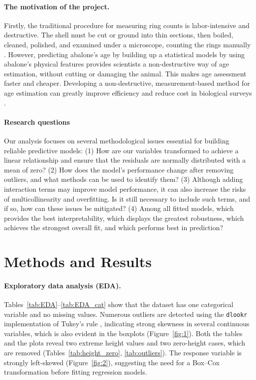 \documentclass[12pt]{article}
\begin{document}
	\paragraph{The motivation of the project.} Firstly, the traditional procedure for measuring ring counts is labor-intensive and destructive. The shell must be cut or ground into thin sections, then boiled, cleaned, polished, and examined under a microscope, counting the rings manually \citep{nash1994abalone, day1992abalone}. However, predicting abalone's age by building up a statistical models by using abalone's physical features provides scientists a non-destructive way of age estimation, without cutting or damaging the animal. This makes age assessment faster and cheaper. Developing a non-destructive, measurement-based method for age estimation can greatly improve efficiency and reduce cost in biological surveys \citep{NOAA2020agegrowth}.
	
	\paragraph{Research questions} Our analysis focuses on several methodological issues essential for building reliable predictive models: (1) How are our variables transformed to achieve a linear relationship and ensure that the residuals are normally distributed with a mean of zero? (2) How does the model’s performance change after removing outliers, and what methods can be used to identify them? (3) Although adding interaction terms may improve model performance, it can also increase the risks of multicollinearity and overfitting. Is it still necessary to include such terms, and if so, how can these issues be mitigated? (4) Among all fitted models, which provides the best interpretability, which displays the greatest robustness, which achieves the strongest overall fit, and which performs best in prediction?
	
	\section*{Methods and Results}
	\paragraph{Exploratory data analysis (EDA).}
	Tables~\ref{tab:EDA}–\ref{tab:EDA_cat} show that the dataset has one categorical variable and no missing values. Numerous outliers are detected using the \texttt{dlookr} implementation of Tukey’s rule \citep{tukey1977exploratory}, indicating strong skewness in several continuous variables, which is also evident in the boxplots (Figure~\ref{fig:1}).
	 Both the tables and the plots reveal two extreme height values and two zero-height cases, which are removed (Tables~\ref{tab:height_zero}, \ref{tab:outliers}). The response variable is strongly left-skewed (Figure~\ref{fig:2}), suggesting the need for a Box–Cox transformation before fitting regression models.
	
\end{document}

